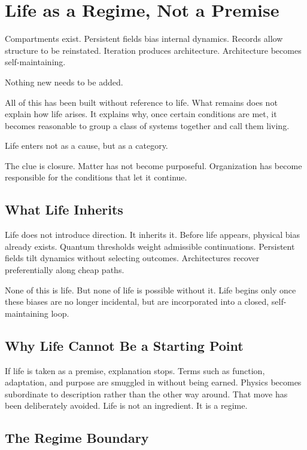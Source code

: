 \documentclass[11pt,twoside,openright]{book}
\begin{document}
\chapter{Life as a Regime, Not a Premise}

Compartments exist. Persistent fields bias internal dynamics. Records allow structure to be reinstated. Iteration produces architecture. Architecture becomes self-maintaining.

Nothing new needs to be added.

All of this has been built without reference to life. What remains does not explain how life arises. It explains why, once certain conditions are met, it becomes reasonable to group a class of systems together and call them living.

Life enters not as a cause, but as a category.

The clue is closure. Matter has not become purposeful. Organization has become responsible for the conditions that let it continue.
\section*{What Life Inherits}

Life does not introduce direction. It inherits it. Before life appears, physical bias already exists. Quantum thresholds weight admissible continuations. Persistent fields tilt dynamics without selecting outcomes. Architectures recover preferentially along cheap paths.

None of this is life. But none of life is possible without it. Life begins only once these biases are no longer incidental, but are incorporated into a closed, self-maintaining loop.

\section*{Why Life Cannot Be a Starting Point}

If life is taken as a premise, explanation stops. Terms such as function, adaptation, and purpose are smuggled in without being earned. Physics becomes subordinate to description rather than the other way around. That move has been deliberately avoided. Life is not an ingredient. It is a regime.

\section*{The Regime Boundary}
\end{document}
